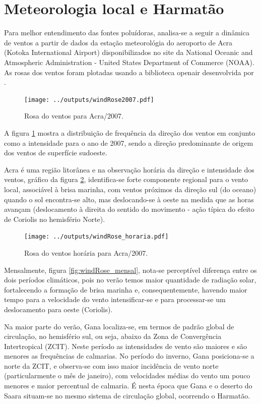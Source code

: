\section{Meteorologia local e Harmatão}

Para melhor entendimento das fontes poluídoras, analisa-se a seguir a 
dinâmica de ventos a partir de dados da estação meteorológia do 
aeroporto de Acra (Kotoka International Airport) disponibilizados no site da 
National Oceanic and Atmospheric Administration - United States Department of 
Commerce (NOAA). As rosas dos ventos foram plotadas usando a biblioteca 
openair desenvolvida por \citet{carslaw2012}.

\begin{figure}[H]
  \centering
  \texttt{[image: ../outputs/windRose2007.pdf]}
  \caption{Rosa do ventos para Acra/2007. \label{fg:rosaCompleta}}
\end{figure}

A figura \ref{fg:rosaCompleta} mostra a distribuição de frequência da direção 
dos ventos em conjunto como a intensidade para o ano de 2007, sendo a direção 
predominante de origem dos ventos de superfície sudoeste.

Acra é uma região litorânea e na observação horária da direção e intensidade 
dos ventos, gráfico da figura \ref{fig:windRose_horaria}, identifica-se 
forte componente regional para o vento local, associável à brisa marinha, 
com ventos próximos da direção sul (do oceano) quando o sol encontra-se alto, 
mas deslocando-se 
à oeste na medida que as horas avançam (deslocamento à direita do sentido do 
movimento - ação típica do efeito de Coriolis no hemisfério Norte).

\begin{figure}[H]
  \centering
  \texttt{[image: ../outputs/windRose\_horaria.pdf]}
  \caption{Rosa do ventos horária para Acra/2007. \label{fig:windRose_horaria}}
\end{figure}

Mensalmente, figura \ref{fig:windRose_mensal}, nota-se perceptível diferença 
entre os dois períodos climáticos, pois no verão temos maior quantidade de 
radiação solar, fortalecendo a formação de brisa marinha e, consequentemente, 
havendo maior tempo para a velocidade do vento intensificar-se e para 
processar-se um deslocamento para oeste (Coriolis).

Na maior parte do verão, Gana localiza-se, em termos de padrão global de 
circulação, no hemisfério sul, ou seja, abaixo da Zona de Convergência 
Intertropical (ZCIT). Neste período as intensidades de vento são maiores e 
são menores as frequências de calmarias. No período do inverno, Gana 
posiciona-se a norte da ZCIT, e observa-se com isso maior incidência de 
vento norte (particularmente o mês de janeiro), 
com velocidades médias do vento um pouco menores e maior percentual
de calmaria. É nesta época que Gana e o deserto do Saara situam-se no mesmo 
sistema de circulação global, ocorrendo o Harmatão. 

